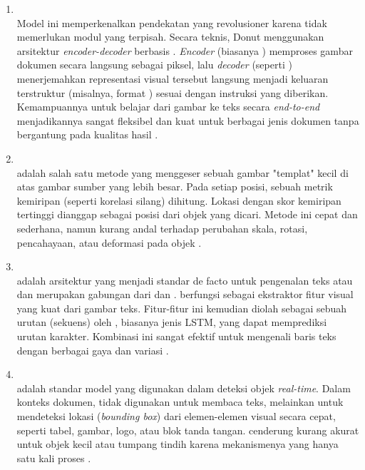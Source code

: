 \begin{enumerate}
    \item \donut{} ~\\ Model ini memperkenalkan pendekatan yang revolusioner karena tidak memerlukan modul \ocr{} yang terpisah. Secara teknis, Donut menggunakan arsitektur \textit{encoder-decoder} berbasis \transformer. \textit{Encoder} (biasanya \swin) memproses gambar dokumen secara langsung sebagai piksel, lalu \textit{decoder} (seperti \bart) menerjemahkan representasi visual tersebut langsung menjadi keluaran terstruktur (misalnya, format \json) sesuai dengan instruksi yang diberikan. Kemampuannya untuk belajar dari gambar ke teks secara \textit{end-to-end} menjadikannya sangat fleksibel dan kuat untuk berbagai jenis dokumen tanpa bergantung pada kualitas hasil \ocr{} \parencite{kim2021donut}.

    \item \templatematching{} ~\\ \templatematching{} adalah salah satu metode \cv yang menggeser sebuah gambar "templat" kecil di atas gambar sumber yang lebih besar. Pada setiap posisi, sebuah metrik kemiripan (seperti korelasi silang) dihitung. Lokasi dengan skor kemiripan tertinggi dianggap sebagai posisi dari objek yang dicari. Metode ini cepat dan sederhana, namun kurang andal terhadap perubahan skala, rotasi, pencahayaan, atau deformasi pada objek \parencite{bradski2008learning}.

    \item \crnn ~\\ 
    \crnn{} adalah arsitektur \dl{} yang menjadi standar de facto untuk pengenalan teks atau \ocr{} dan merupakan gabungan dari \cnn{} dan \rnn. \cnn{} berfungsi sebagai ekstraktor fitur visual yang kuat dari gambar teks. Fitur-fitur ini kemudian diolah sebagai sebuah urutan (sekuens) oleh \rnn, biasanya jenis LSTM, yang dapat memprediksi urutan karakter. Kombinasi ini sangat efektif untuk mengenali baris teks dengan berbagai gaya dan variasi \parencite{shi2016end}.

    \item \yolo ~\\ \yolo{} adalah standar model yang digunakan dalam deteksi objek \textit{real-time}. Dalam konteks dokumen, \yolo{} tidak digunakan untuk membaca teks, melainkan untuk mendeteksi lokasi (\emph{bounding box}) dari elemen-elemen visual secara cepat, seperti tabel, gambar, logo, atau blok tanda tangan. \yolo{} cenderung kurang akurat untuk objek kecil atau tumpang tindih karena mekanismenya yang hanya satu kali proses \parencite{diwan2023object}. 
    

\end{enumerate}
